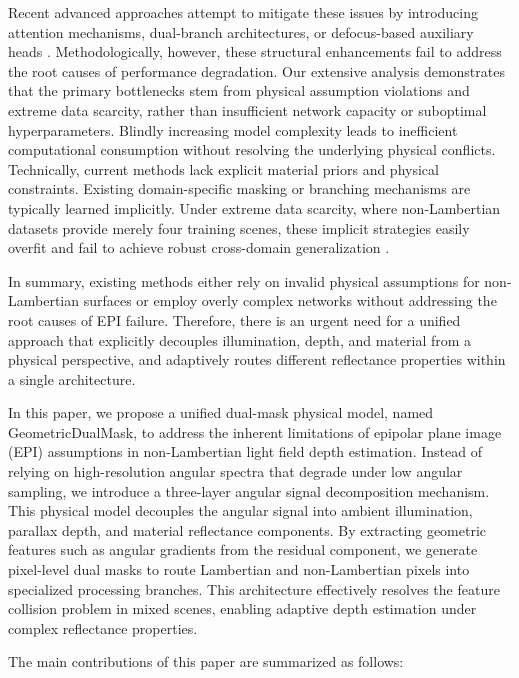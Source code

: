 \documentclass[lettersize,journal]{IEEEtran}
\begin{document}
Recent advanced approaches attempt to mitigate these issues by introducing attention mechanisms, dual-branch architectures, or defocus-based auxiliary heads \cite{12}. Methodologically, however, these structural enhancements fail to address the root causes of performance degradation. Our extensive analysis demonstrates that the primary bottlenecks stem from physical assumption violations and extreme data scarcity, rather than insufficient network capacity or suboptimal hyperparameters. Blindly increasing model complexity leads to inefficient computational consumption without resolving the underlying physical conflicts. Technically, current methods lack explicit material priors and physical constraints. Existing domain-specific masking or branching mechanisms are typically learned implicitly. Under extreme data scarcity, where non-Lambertian datasets provide merely four training scenes, these implicit strategies easily overfit and fail to achieve robust cross-domain generalization \cite{13}.

In summary, existing methods either rely on invalid physical assumptions for non-Lambertian surfaces or employ overly complex networks without addressing the root causes of EPI failure. Therefore, there is an urgent need for a unified approach that explicitly decouples illumination, depth, and material from a physical perspective, and adaptively routes different reflectance properties within a single architecture.

In this paper, we propose a unified dual-mask physical model, named GeometricDualMask, to address the inherent limitations of epipolar plane image (EPI) assumptions in non-Lambertian light field depth estimation. Instead of relying on high-resolution angular spectra that degrade under low angular sampling, we introduce a three-layer angular signal decomposition mechanism. This physical model decouples the angular signal into ambient illumination, parallax depth, and material reflectance components. By extracting geometric features such as angular gradients from the residual component, we generate pixel-level dual masks to route Lambertian and non-Lambertian pixels into specialized processing branches. This architecture effectively resolves the feature collision problem in mixed scenes, enabling adaptive depth estimation under complex reflectance properties.

The main contributions of this paper are summarized as follows:
\end{document}
